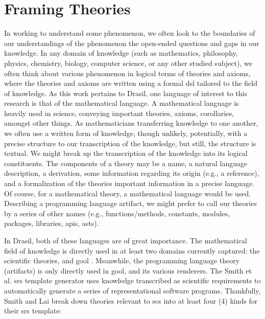 
\chapter{Framing Theories}
\label{chap:modelkinds}

In working to understand some phenomenon, we often look to the boundaries of our
understandings of the phenomenon \textemdash{} the open-ended questions and gaps in our
knowledge. In any domain of knowledge (such as mathematics, philosophy, physics,
chemistry, biology, computer science, or any other studied subject), we often
think about various phenomenon in logical terms of theories and axioms, where
the theories and axioms are written using a formal \acs{dsl} tailored to the
field of knowledge. As this work pertains to Drasil, one language of interest to
this research is that of the mathematical language. A mathematical language is
heavily used in science, conveying important theories, axioms, corollaries,
amongst other things. As mathematicians transferring knowledge to one another,
we often use a written form of knowledge, though unlikely, potentially, with a
precise structure to our transcription of the knowledge, but still, the
structure is textual. We might break up the transcription of the knowledge into
its logical constituents. The components of a theory may be a name, a natural
language description, a derivation, some information regarding its origin (e.g.,
a reference), and a formalization of the theories important information in a
precise language. Of course, for a mathematical theory, a mathematical language
would be used. Describing a programming language artifact, we might prefer to
call our theories by a series of other names (e.g., functions/methods,
constants, modules, packages, libraries, \acsp{api}, \acsp{ast}).

In Drasil, both of these languages are of great importance. The mathematical
field of knowledge is directly used in at least two domains currently captured:
the scientific theories, and \acs{gool} \cite{Carette2019}. Meanwhile, the
programming language theory (artifacts) is only directly used in \acs{gool}, and
its various renderers. The Smith et al. \acs{srs} \cite{SmithAndLai2005}
template generator uses knowledge transcribed as scientific requirements to
automatically generate a series of representational software programs.
Thankfully, Smith and Lai \cite{SmithAndLai2005} break down theories relevant to
\acs{scs} into at least four (4) kinds for their \acs{srs} template:

